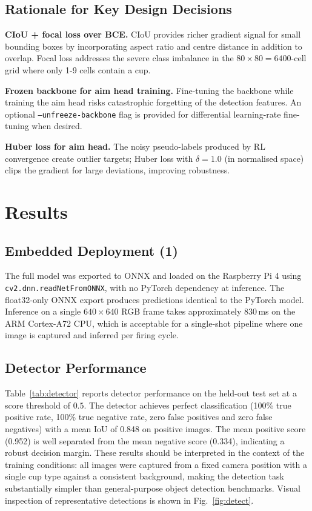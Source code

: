 \documentclass[conference]{IEEEtran}
\begin{document}
\subsection{Rationale for Key Design Decisions}

\textbf{CIoU + focal loss over BCE.}  CIoU provides richer gradient signal for
small bounding boxes by incorporating aspect ratio and centre distance in
addition to overlap.  Focal loss addresses the severe class imbalance in the
$80{\times}80 = 6400$-cell grid where only 1-9 cells contain a cup.

\textbf{Frozen backbone for aim head training.}  Fine-tuning the backbone while
training the aim head risks catastrophic forgetting of the detection features.
An optional \texttt{--unfreeze-backbone} flag is provided for differential
learning-rate fine-tuning when desired.

\textbf{Huber loss for aim head.}  The noisy pseudo-labels produced by RL
convergence create outlier targets; Huber loss with $\delta=1.0$ (in
normalised space) clips the gradient for large deviations, improving
robustness.

\section{Results}
\label{sec:results}

\subsection{Embedded Deployment (1)}

The full model was exported to ONNX and loaded on the Raspberry Pi 4 using
\texttt{cv2.dnn.readNetFromONNX}, with no PyTorch dependency at inference.
The float32-only ONNX export produces predictions identical to the PyTorch
model.  Inference on a single $640{\times}640$ RGB frame takes approximately
830\,ms on the ARM Cortex-A72 CPU, which is acceptable for a single-shot
pipeline where one image is captured and inferred per firing cycle.

\subsection{Detector Performance}

Table~\ref{tab:detector} reports detector performance on the held-out test set
at a score threshold of $0.5$.  The detector achieves perfect classification
(100\% true positive rate, 100\% true negative rate, zero false positives and
zero false negatives) with a mean IoU of 0.848 on positive images.  The mean
positive score (0.952) is well separated from the mean negative score (0.334),
indicating a robust decision margin.  These results should be interpreted in
the context of the training conditions: all images were captured from a fixed
camera position with a single cup type against a consistent background, making
the detection task substantially simpler than general-purpose object detection
benchmarks.  Visual inspection of representative detections is shown in
Fig.~\ref{fig:detect}.
\end{document}
